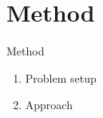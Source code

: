\section{Method}
\begin{frame}{Method}
  \begin{enumerate}
    \item Problem setup
    \item Approach
  \end{enumerate}
\end{frame}
